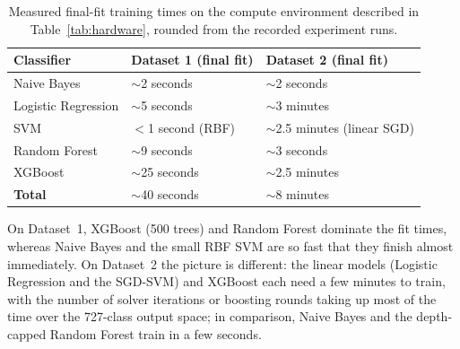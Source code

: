 \begin{table}[H]
\centering
\caption{Measured final-fit training times on the compute environment described in Table~\ref{tab:hardware}, rounded from the recorded experiment runs.}
\label{tab:training_times}
\begin{tabular}{@{}lll@{}}
\toprule
\textbf{Classifier} & \textbf{Dataset 1} (final fit) & \textbf{Dataset 2} (final fit) \\
\midrule
Naive Bayes         & $\sim$2 seconds  & $\sim$2 seconds \\
Logistic Regression & $\sim$5 seconds  & $\sim$3 minutes \\
SVM                 & $<$1 second (RBF) & $\sim$2.5 minutes (linear SGD) \\
Random Forest       & $\sim$9 seconds  & $\sim$3 seconds \\
XGBoost             & $\sim$25 seconds & $\sim$2.5 minutes \\
\midrule
\textbf{Total}      & $\sim$40 seconds & $\sim$8 minutes \\
\bottomrule
\end{tabular}
\end{table}

On Dataset~1, XGBoost (500 trees) and Random Forest dominate the fit times, whereas Naive Bayes and the small RBF SVM are so fast that they finish almost immediately. On Dataset~2 the picture is different: the linear models (Logistic Regression and the SGD-SVM) and XGBoost each need a few minutes to train, with the number of solver iterations or boosting rounds taking up most of the time over the 727-class output space; in comparison, Naive Bayes and the depth-capped Random Forest train in a few seconds.


